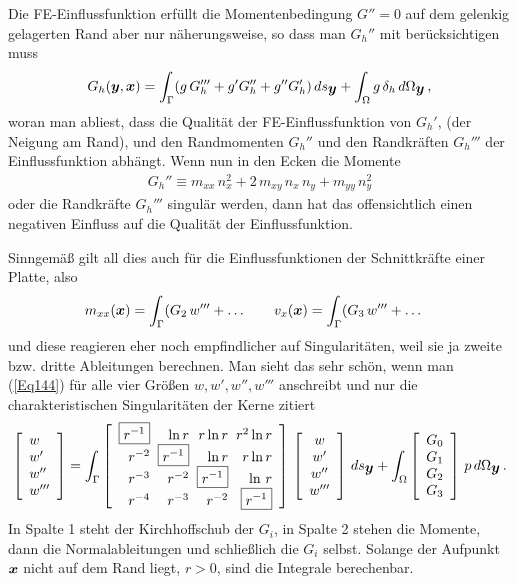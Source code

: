 {Die FE-Einflussfunktion erf\"{u}llt die Momentenbedingung $G'' = 0$ auf dem gelenkig gelagerten Rand aber nur n\"{a}herungsweise, so dass man $G_h''$ mit ber\"{u}cksichtigen muss
\begin{align}
G_h(\mbox{\boldmath $y$},\mbox{\boldmath $x$}) = \int_{\Gamma} (g\,G_h''' + g' G_h'' + g'' G_h')\,ds_{\mbox{\boldmath $y$}} + \int_{\Omega} g \,\delta_h\,d\Omega_{\mbox{\boldmath $y$}}\,,
\end{align}
woran man abliest, dass die Qualit\"{a}t der FE-Einflussfunktion von $G_h'$, (der Neigung am Rand), und den Randmomenten $G_h''$ und den Randkr\"{a}ften $G_h'''$ der Einflussfunktion abh\"{a}ngt. Wenn nun in den Ecken die Momente
\begin{align}
G_h'' \equiv m_{xx}\, n_x^2 + 2\,m_{xy}\,n_x\,n_y + m_{yy}\,n_y^2
\end{align}
oder die Randkr\"{a}fte $G_h'''$ singul\"{a}r werden, dann hat das offensichtlich einen negativen Einfluss auf die Qualit\"{a}t der Einflussfunktion.

Sinngem\"{a}{\ss} gilt all dies auch f\"{u}r die Einflussfunktionen der Schnittkr\"{a}fte einer Platte, also
\begin{align}
m_{xx}(\mbox{\boldmath $x$}) &= \int_{\Gamma} (G_2\,w''' + \ldots  \qquad v_x(\mbox{\boldmath $x$}) = \int_{\Gamma} (G_3\,w''' + \ldots
\end{align}
und diese reagieren eher noch empfindlicher auf Singularit\"{a}ten, weil sie ja zweite bzw. dritte Ableitungen berechnen. Man sieht das sehr sch\"{o}n, wenn man (\ref{Eq144}) f\"{u}r alle vier Gr\"{o}{\ss}en $w, w', w'', w'''$ anschreibt und nur die charakteristischen Singularit\"{a}ten der Kerne zitiert
\begin{align}\label{Eq150}
\left[\barr{l} w \\ w'\\ w''\\ w'''\earr\right] = \int_{\Gamma}\left[\barr{r @{\hspace{2mm}}r @{\hspace{2mm}}r @{\hspace{2mm}}r} \boxed{r^{-1}} & \ln r & r \ln r & r^2\ln r \\ r^{-2} &\boxed{r^{-1}} & \ln r & r\ln r\\ r^{-3} & r^{-2} & \boxed{r^{-1}} & \ln\, r\\ r^{-4} & r^{-3} & r^{-2} &\boxed{r^{-1}}\earr\right]
\,\left[\barr{c} w \\w' \\ w'' \\ w''' \earr \right] \,ds_{\vek y} + \int_{\Omega} \left[\barr{l} G_0 \\ G_1\\ G_2\\ G_3\earr\right]\,p\,d\Omega_{\vek y}\,.
\end{align}
In Spalte 1 steht der Kirchhoffschub der $G_i$, in Spalte 2 stehen die Momente, dann die Normalableitungen und schlie{\ss}lich die $G_i$ selbst. Solange der Aufpunkt $\mbox{\boldmath $x$}$ nicht auf dem Rand liegt, $r > 0$, sind die Integrale berechenbar.

}

